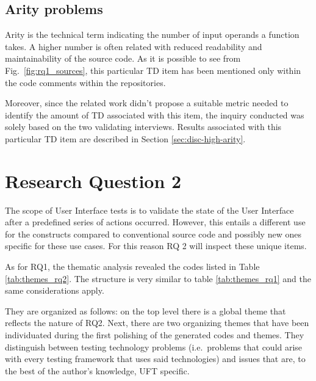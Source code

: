 \subsection{Arity problems}
Arity is the technical term indicating the number of input operands a function takes. A higher number is often related with reduced readability and maintainability of the source code. As it is possible to see from Fig.\ \ref{fig:rq1_sources}, this particular TD item has been mentioned only within the code comments within the repositories.

Moreover, since the related work didn't propose a suitable metric needed to identify the amount of TD associated with this item, the inquiry conducted was solely based on the two validating interviews. Results associated with this particular TD item are described in Section \ref{sec:disc-high-arity}.


\FloatBarrier

\section{Research Question 2}
%
The scope of User Interface tests is to validate the state of the User Interface after a predefined series of actions occurred. However, this entails a different use for the constructs compared to conventional source code and possibly new ones specific for these use cases. For this reason RQ 2 will inspect these unique items.

As for RQ1, the thematic analysis revealed the codes listed in Table \ref{tab:themes_rq2}. The structure is very similar to table \ref{tab:themes_rq1} and the same considerations apply. 

They are organized as follows: on the top level there is a global theme that reflects the nature of RQ2. Next, there are two organizing themes that have been individuated during the first polishing of the generated codes and themes. They distinguish between testing technology problems (i.e.\ problems that could arise with every testing framework that uses said technologies) and issues that are, to the best of the author's knowledge, UFT specific.

